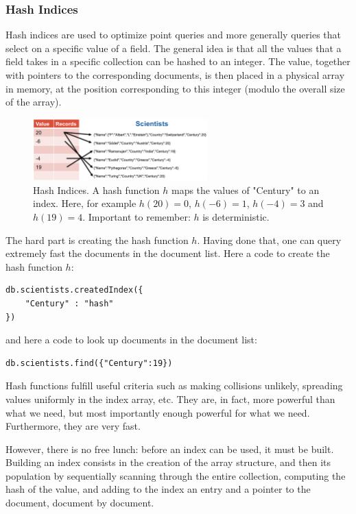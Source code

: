 \subsubsection{Hash Indices}

Hash indices are used to optimize point queries and more generally queries that select on a specific value of a field. The general idea is that all the values that a field takes in a specific collection can be hashed to an integer. The value, together with pointers to the corresponding documents, is then placed in a physical array in memory, at the position corresponding to this integer (modulo the
overall size of the array).

\begin{figure}[h]
    \centering
    \includegraphics[width=0.6\textwidth]{Figures/HashIndexing.png}
    \caption{Hash Indices. A hash function $h$ maps the values of "Century" to an index. Here, for example $h(20)=0$, $h(-6)=1$, $h(-4) = 3$ and $h(19)=4$. Important to remember: $h$ is deterministic.}
\end{figure}

The hard part is creating the hash function $h$. Having done that, one can query extremely fast the documents in the document list. Here a code to create the hash function $h$:
\begin{lstlisting}[style=neutral]
db.scientists.createdIndex({
    "Century" : "hash"
})
\end{lstlisting}

and here a code to look up documents in the document list:
\begin{lstlisting}[style=neutral]
db.scientists.find({"Century":19})
\end{lstlisting}

Hash functions fulfill useful criteria such as making collisions unlikely, spreading values uniformly in the index array, etc. They are, in fact, more powerful than what we need, but most importantly enough powerful for what we need. Furthermore, they are very fast.

However, there is no free lunch: before an index can be used, it must be built. Building an index consists in the creation of the array structure, and then its population by sequentially scanning through the entire collection, computing the hash of the value, and adding to the index an entry and a pointer to the document, document by document.

